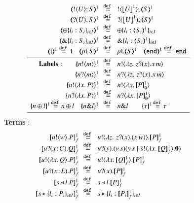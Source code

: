 \begin{figure}[t]
\[\begin{array}{rcll}
	\tmap{\btout{U} S}{1} &\!\!\defeq\!\!& \btout{{\vtmap{U}{1}}} \tmap{S}{1}\\
	\tmap{\btinp{U} S}{1} &\!\!\defeq\!\!& \btinp{{\vtmap{U}{1}}} \tmap{S}{1}\\
	\tmap{\btsel{l_i: S_i}_{i \in I}}{1} &\!\!\defeq\!\!& \btsel{l_i: \tmap{S_i}{1}}_{i \in I}\\
			\tmap{\btbra{l_i: S_i}_{i \in I}}{1} &\!\!\defeq\!\!& \btbra{l_i: \tmap{S_i}{1}}_{i \in I}\\
	\tmap{\vart{t}}{1} \defeq \vart{t} \quad 
			\tmap{\trec{t}{S}}{1}  &\!\!\defeq\!\!&
	\trec{t}{\tmap{S}{1}}\quad 
	\tmap{\tinact}{1}  \defeq  \tinact\\[1mm]
	\hline
	\noindent{\bf Labels:} \quad \quad 
		\mapa{\bactout{n}{m}}^{1} &\!\!\defeq\!\!&   \bactout{n}{\abs{z}{\,\binp{z}{x} \appl{x}{m}} } \\
		\mapa{\bactinp{n}{m}}^{1} &\!\!\defeq\!\!&   \bactinp{n}{\abs{z}{\,\binp{z}{x} \appl{x}{m}} } \\
			\mapa{\bactout{n}{\abs{{x}}{P}}}^{1} &\!\!\defeq\!\!& \bactout{n}{\abs{{x}}{\pmapp{P}{1}{\es}}}\\
			\mapa{\bactinp{n}{\abs{{x}}{P}}}^{1} &\!\!\defeq\!\!& \bactinp{n}{\abs{{x}}{\pmapp{P}{1}{\es}}}\\
			\mapa{\bactsel{n}{l} }^{1} \!\defeq\! \bactsel{n}{l} 
	\quad 
			\mapa{\bactbra{n}{l} }^{1} &\!\!\defeq\!\!& \bactbra{n}{l} 
	\quad \quad 
			\mapa{\tau}^{1} \!\defeq\! \tau
\\[1mm]
\hline
\end{array}
\]
{\bf Terms} : 
\[
\begin{array}{rcll}
  \pmapp{\bout{u}{w} P}{1}{f}	&\!\!\defeq\!\!&	\bout{u}{ \abs{z}{\,\binp{z}{x} (\appl{x}{w})} } \pmapp{P}{1}{f} \\
  \pmapp{\binp{u}{\AT{x}{C}} Q}{1}{f}	&\!\!\defeq\!\!&	\binp{u}{y} \newsp{s}{\appl{y}{s} \Par \bout{\dual{s}}{\abs{x}{\pmapp{Q}{1}{f}}} \inact} \\
		\pmapp{\bout{u}{\abs{{x}}{Q}} P}{1}{f}  
&\!\!\defeq\!\!& \bout{u}{\abs{{x}}{\pmapp{Q}{1}{f}}} \pmapp{P}{1}{f} \\
		\pmapp{\binp{u}{\AT{x}{L}} P}{1}{f} &\!\!\defeq\!\!& \binp{u}{x} \pmapp{P}{1}{f}\\
		\pmapp{\bsel{s}{l} P}{1}{f} &\!\!\defeq\!\!& \bsel{s}{l} \pmapp{P}{1}{f}\\
		\pmapp{\bbra{s}{l_i: P_i}_{i \in I}}{1}{f} &\!\!\defeq\!\!& \bbra{s}{l_i: \pmapp{P_i}{1}{f}}_{i \in I}\\

\end{array}\]
\end{figure}
